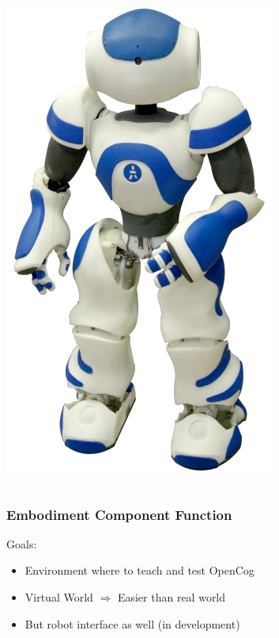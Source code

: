 \documentclass{beamer}
\begin{document}
{\begin{columns}
    \includegraphics[scale=0.2]{nao-robot-791451.png}
 \end{columns}


}

\frame
{

  \frametitle{Embodiment Component Function}

  Goals:
  \begin{itemize}
  \item<+-> Environment where to teach and test OpenCog
  \item<+-> Virtual World $\Rightarrow$ Easier than real world
  \item<+-> But robot interface as well (in development)
  \end{itemize}

}
\end{document}

